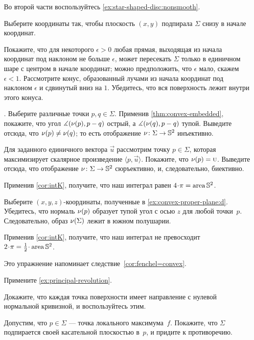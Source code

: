 \begin{multicols}{2}
Во второй части воспользуйтесь \ref{ex:star-shaped-disc:nonsmooth}.

Выберите координаты так, чтобы плоскость $(x,y)$ подпирала $\Sigma$ снизу в начале координат. 

Покажите, что для некоторого $\epsilon>0$ любая прямая, выходящая из начала координат под наклоном не больше $\epsilon$, может пересекать $\Sigma$ только в единичном шаре с центром в начале координат;
можно предположить, что $\epsilon$ мало, скажем $\epsilon<1$.
Рассмотрите конус, образованный лучами из начала координат под наклоном $\epsilon$ и сдвинутый вниз на $1$.
Убедитесь, что вся поверхность лежит внутри этого конуса.

\parbf{\ref{ex:intK}}.
Выберите различные точки $p,q\in\Sigma$.
Применив \ref{thm:convex-embedded}, покажите, что угол $\measuredangle(\Norm(p),p\z-q)$ острый, а $\measuredangle(\Norm(q),p\z-q)$ тупой.
Выведите отсюда, что $\nu(p)\ne\nu(q)$;
то есть отображение $\nu\colon\Sigma\to\mathbb{S}^2$ инъективно.

Для заданного единичного вектора $\vec u$ рассмотрим точку $p\in \Sigma$, которая максимизирует скалярное произведение $\langle p,\vec u\rangle$.
Покажите, что $\nu(p)=\text{\sc{u}}$.
Выведите отсюда, что отображение $\nu\colon\Sigma\to\mathbb{S}^2$ сюръективно, и, следовательно, биективно.

Применив \ref{cor:intK}, получите, что наш интеграл равен $4\cdot\pi=\area\mathbb{S}^2$.

Выберите $(x,y,z)$-координаты, полученные в \ref{ex:convex-proper-plane:d}.
Убедитесь, что нормаль $\nu(p)$ образует тупой угол с осью $z$ для любой точки~$p$.
Следовательно, образ $\nu(\Sigma)$ лежит в южном полушарии.

Применив \ref{cor:intK}, получите, что наш интеграл не превосходит $2\cdot\pi=\tfrac12\cdot\area\mathbb{S}^2$.

Это упражнение напоминает следствие~\ref{cor:fenchel=convex}.

\setcounter{eqtn}{0}

Примените \ref{ex:principal-revolution}.

Докажите, что каждая точка поверхности имеет направление с нулевой нормальной кривизной, и воспользуйтесь этим.

Допустим, что $p\in \Sigma$ --- точка локального максимума~$f$.
Покажите, что $\Sigma$ подпирается своей касательной плоскостью в~$p$,
и придите к противоречию.


\end{multicols}
